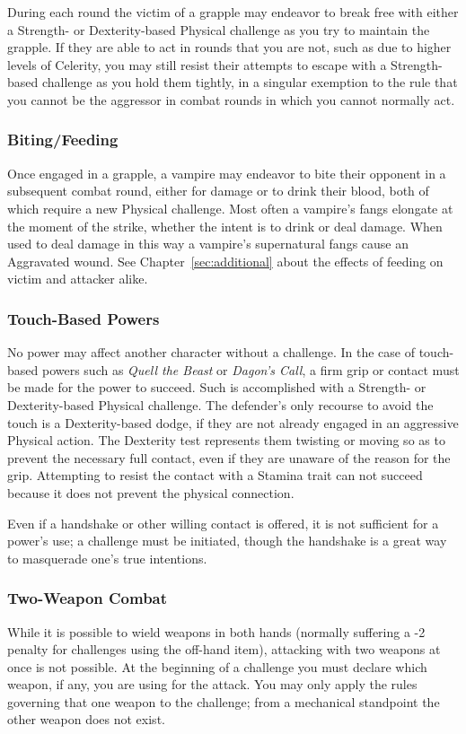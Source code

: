 During each round the victim of a grapple may endeavor to break free with either a Strength- or Dexterity-based 
Physical challenge as you try to maintain the grapple.  If they are able to act in rounds that you are not, 
such as due to higher levels of Celerity, you may still resist their attempts to escape with a Strength-based 
challenge as you hold them tightly, in a singular exemption to the rule that you cannot be the aggressor 
in combat rounds in which you cannot normally act.

\subsubsection{Biting/Feeding}
Once engaged in a grapple, a vampire may endeavor to bite their opponent in a subsequent combat round, either 
for damage or to drink their blood, both of which require a new Physical challenge.  Most often a vampire's 
fangs elongate at the moment of the strike, whether the intent is to drink or deal damage.  When used to deal 
damage in this way a vampire's supernatural fangs cause an Aggravated wound.  See Chapter~\ref{sec:additional} 
about the effects of feeding on victim and attacker alike.

\subsubsection{Touch-Based Powers}
No power may affect another character without a challenge.  In the case of touch-based powers such 
as \emph{Quell the Beast} or \emph{Dagon's Call}, a firm grip or contact must be made for the power 
to succeed.  Such is accomplished with a Strength- or Dexterity-based Physical challenge.  The 
defender's only recourse to avoid the touch is a Dexterity-based dodge, if they are not already 
engaged in an aggressive Physical action.  The Dexterity test represents them twisting or moving so as 
to prevent the necessary full contact, even if they are unaware of the reason for the grip.  Attempting 
to resist the contact with a Stamina trait can not succeed because it does not prevent the physical 
connection.

Even if a handshake or other willing contact is offered, it is not sufficient for a power's use; a 
challenge must be initiated, though the handshake is a great way to masquerade one's true intentions.

\subsubsection{Two-Weapon Combat}
While it is possible to wield weapons in both hands (normally suffering a -2 penalty for challenges 
using the off-hand item), attacking with two weapons at once is not possible.  At the beginning of a 
challenge you must declare which weapon, if any, you are using for the attack.  You may only apply 
the rules governing that one weapon to the challenge; from a mechanical standpoint the other weapon 
does not exist.

